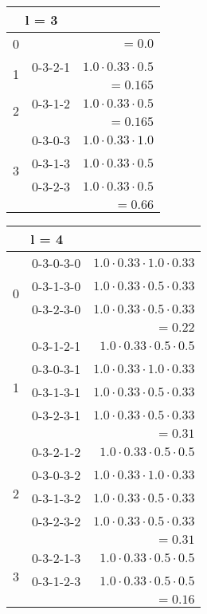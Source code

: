 \begin{multicols}{2}
\begin{tabular}{lcr}
\toprule
\multicolumn{2}{c}{l = 3}&\phantom{$1.0 \cdot 0.33 \cdot 0.5 \cdot 0.33$}\\\midrule
0	&						&$=0.0$\\
\hline
\multirow{2}{*}{1}&0-3-2-1 			&$1.0 \cdot 0.33 \cdot 0.5$\\
	&						&$=0.165$\\
\hline
\multirow{2}{*}{2}&0-3-1-2 			&$1.0 \cdot 0.33 \cdot 0.5$\\
	&						&$=0.165$\\
\hline
\multirow{4}{*}{3}&0-3-0-3 			&$1.0 \cdot 0.33 \cdot 1.0$\\
	&0-3-1-3 			&$1.0 \cdot 0.33 \cdot 0.5$\\
	&0-3-2-3 			&$1.0 \cdot 0.33 \cdot 0.5$\\
	&\phantom{0-3-2-3-2}&$=0.66$\\
\bottomrule
\end{tabular}


\begin{tabular}{lcr}
\toprule
\multicolumn{2}{c}{l = 4}&\phantom{$1.0 \cdot 0.33 \cdot 0.5 \cdot 0.33$}\\\midrule
\multirow{4}{*}{0}&0-3-0-3-0	&$1.0 \cdot 0.33 \cdot 1.0 \cdot 0.33$\\
	&0-3-1-3-0	&$1.0 \cdot 0.33 \cdot 0.5 \cdot 0.33$\\
	&0-3-2-3-0	&$1.0 \cdot 0.33 \cdot 0.5 \cdot 0.33$\\
	&					&$=0.22$\\
\hline
\multirow{5}{*}{1}&0-3-1-2-1	&$1.0 \cdot 0.33 \cdot 0.5 \cdot 0.5$\\
	&0-3-0-3-1	&$1.0 \cdot 0.33 \cdot 1.0 \cdot 0.33$\\
	&0-3-1-3-1	&$1.0 \cdot 0.33 \cdot 0.5 \cdot 0.33$\\
	&0-3-2-3-1	&$1.0 \cdot 0.33 \cdot 0.5 \cdot 0.33$\\
	&					&$=0.31$\\
\hline
\multirow{5}{*}{2}&0-3-2-1-2	&$1.0 \cdot 0.33 \cdot 0.5 \cdot 0.5$\\
	&0-3-0-3-2	&$1.0 \cdot 0.33 \cdot 1.0 \cdot 0.33$\\
	&0-3-1-3-2	&$1.0 \cdot 0.33 \cdot 0.5 \cdot 0.33$\\
	&0-3-2-3-2	&$1.0 \cdot 0.33 \cdot 0.5 \cdot 0.33$\\
	&					&$=0.31$\\
\hline
\multirow{3}{*}{3}&0-3-2-1-3	&$1.0 \cdot 0.33 \cdot 0.5 \cdot 0.5$\\
	&0-3-1-2-3	&$1.0 \cdot 0.33 \cdot 0.5 \cdot 0.5$\\
	&					&$=0.16$\\
\bottomrule
\end{tabular}
\end{multicols}
